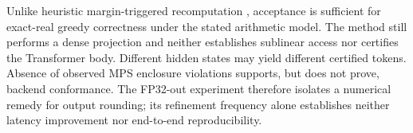 Unlike heuristic margin-triggered recomputation \cite{du2026precision}, acceptance is sufficient for exact-real greedy correctness under the stated arithmetic model. The method still performs a dense projection and neither establishes sublinear access nor certifies the Transformer body. Different hidden states may yield different certified tokens. Absence of observed MPS enclosure violations supports, but does not prove, backend conformance. The FP32-out experiment therefore isolates a numerical remedy for output rounding; its refinement frequency alone establishes neither latency improvement nor end-to-end reproducibility.
